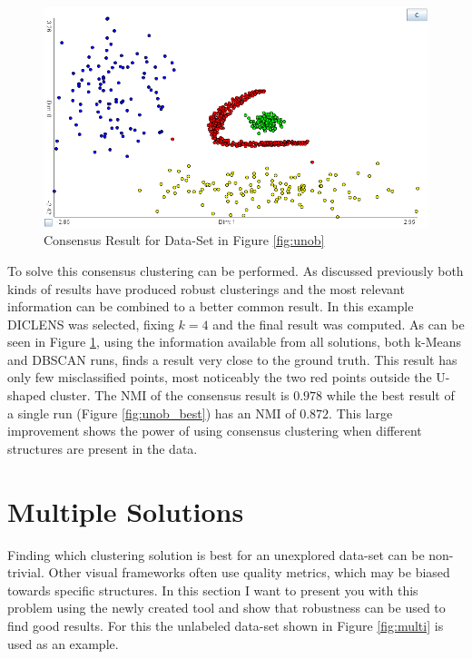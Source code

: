\documentclass[
	a4paper,
	english,
	twoside,
	openright,               
	11pt                            
	]{report}
\begin{document}
\begin{figure}[h]
	\centering
	\includegraphics[scale=.4]{unob_consensus}
	\caption{Consensus Result for Data-Set in Figure \ref{fig:unob}}
	\label{fig:unob_consensus}
\end{figure}

To solve this consensus clustering can be performed. As discussed previously both kinds of results have produced robust clusterings and the most relevant information can be combined to a better common result. In this example DICLENS was selected, fixing $k=4$ and the final result was computed. As can be seen in Figure \ref{fig:unob_consensus}, using the information available from all solutions, both k-Means and DBSCAN runs, finds a result very close to the ground truth. This result has only few misclassified points, most noticeably the two red points outside the U-shaped cluster. The NMI of the consensus result is $0.978$ while the best result of a single run (Figure \ref{fig:unob_best}) has an NMI of $0.872$. This large improvement shows the power of using consensus clustering when different structures are present in the data.


\section{Multiple Solutions}\label{sec:multi_sol}
Finding which clustering solution is best for an unexplored data-set can be non-trivial. Other visual frameworks often use quality metrics, which may be biased towards specific structures. In this section I want to present you with this problem using the newly created tool and show that robustness can be used to find good results. For this the unlabeled data-set shown in Figure \ref{fig:multi} is used as an example.
\end{document}
